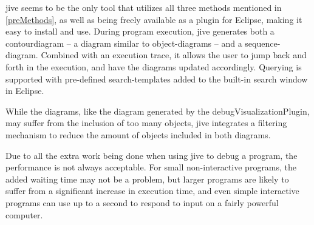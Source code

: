 \Gls{jive} seems to be the only tool that utilizes all three methods mentioned in \cref{preMethods}, as well as being freely available as a plugin for Eclipse, making it easy to install and use.
During program execution, \gls{jive} generates both a \gls{contourdiagram} \cite{Jayaraman1996} -- a diagram similar to object-diagrams -- and a sequence-diagram.
Combined with an execution trace, it allows the user to jump back and forth in the execution, and have the diagrams updated accordingly.
Querying is supported with pre-defined search-templates added to the built-in search window in Eclipse.

While the diagrams, like the diagram generated by the \gls{debugVisualizationPlugin}, may suffer from the inclusion of too many objects, \gls{jive} integrates a filtering mechanism to reduce the amount of objects included in both diagrams.

Due to all the extra work being done when using \gls{jive} to debug a program, the performance is not always acceptable.
For small non-interactive programs, the added waiting time may not be a problem, but larger programs are likely to suffer from a significant increase in execution time, and even simple interactive programs can use up to a second to respond to input on a fairly powerful computer.






